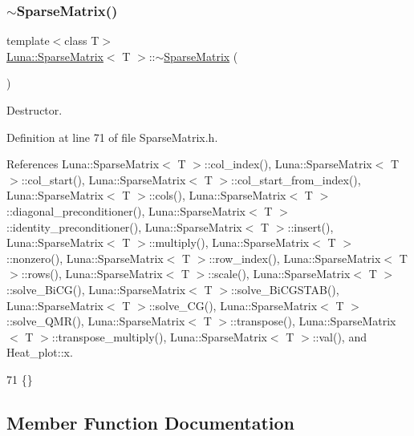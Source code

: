 \subsubsection{\texorpdfstring{$\sim$\+Sparse\+Matrix()}{~SparseMatrix()}}
{\footnotesize\ttfamily template$<$class T$>$ \\
\hyperlink{classLuna_1_1SparseMatrix}{Luna\+::\+Sparse\+Matrix}$<$ T $>$\+::$\sim$\hyperlink{classLuna_1_1SparseMatrix}{Sparse\+Matrix} (\begin{DoxyParamCaption}{ }\end{DoxyParamCaption})\hspace{0.3cm}{\ttfamily [inline]}}



Destructor. 



Definition at line 71 of file Sparse\+Matrix.\+h.



References Luna\+::\+Sparse\+Matrix$<$ T $>$\+::col\+\_\+index(), Luna\+::\+Sparse\+Matrix$<$ T $>$\+::col\+\_\+start(), Luna\+::\+Sparse\+Matrix$<$ T $>$\+::col\+\_\+start\+\_\+from\+\_\+index(), Luna\+::\+Sparse\+Matrix$<$ T $>$\+::cols(), Luna\+::\+Sparse\+Matrix$<$ T $>$\+::diagonal\+\_\+preconditioner(), Luna\+::\+Sparse\+Matrix$<$ T $>$\+::identity\+\_\+preconditioner(), Luna\+::\+Sparse\+Matrix$<$ T $>$\+::insert(), Luna\+::\+Sparse\+Matrix$<$ T $>$\+::multiply(), Luna\+::\+Sparse\+Matrix$<$ T $>$\+::nonzero(), Luna\+::\+Sparse\+Matrix$<$ T $>$\+::row\+\_\+index(), Luna\+::\+Sparse\+Matrix$<$ T $>$\+::rows(), Luna\+::\+Sparse\+Matrix$<$ T $>$\+::scale(), Luna\+::\+Sparse\+Matrix$<$ T $>$\+::solve\+\_\+\+Bi\+C\+G(), Luna\+::\+Sparse\+Matrix$<$ T $>$\+::solve\+\_\+\+Bi\+C\+G\+S\+T\+A\+B(), Luna\+::\+Sparse\+Matrix$<$ T $>$\+::solve\+\_\+\+C\+G(), Luna\+::\+Sparse\+Matrix$<$ T $>$\+::solve\+\_\+\+Q\+M\+R(), Luna\+::\+Sparse\+Matrix$<$ T $>$\+::transpose(), Luna\+::\+Sparse\+Matrix$<$ T $>$\+::transpose\+\_\+multiply(), Luna\+::\+Sparse\+Matrix$<$ T $>$\+::val(), and Heat\+\_\+plot\+::x.


\begin{DoxyCode}
71 \{\}
\end{DoxyCode}


\subsection{Member Function Documentation}
\mbox{\label{classLuna_1_1SparseMatrix_ae7f456c12b3075f21b15bb4ee114d8af}} 

